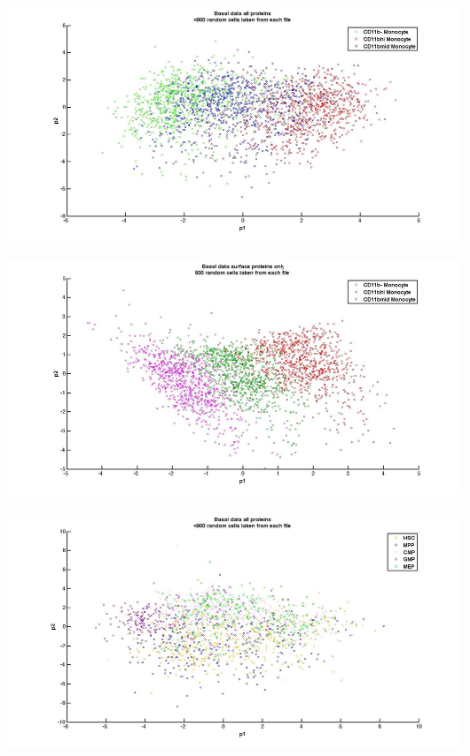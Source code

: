 \documentclass{article} %
\begin{document}
\begin{minipage}{\linewidth}
\centering
  \includegraphics[width=120mm]{Basal_AllProtein_Monocytes.jpg}
\end{minipage}

\begin{minipage}{\linewidth}
\centering
  \includegraphics[width=120mm]{Basal_SurfaceProtein_Monocytes.jpg}
\end{minipage}

\begin{minipage}{\linewidth}
\centering
  \includegraphics[width=120mm]{Basal_AllProtein_StemCells.jpg}
\end{minipage}
\end{document}
